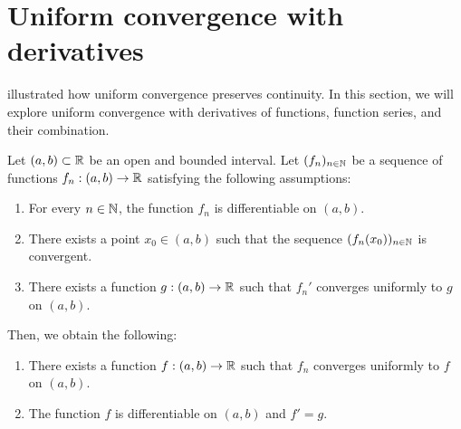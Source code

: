 \section{Uniform convergence with derivatives}
\label{sec:unif_diff}
 illustrated how uniform convergence preserves continuity. In this section, we will explore uniform convergence with derivatives of functions, function series, and their combination.
\begin{thm}
	\label{thm:unif_cvg_diff}
	Let $(a,b)\subset \mathbb{R}$ be an open and bounded interval. Let $(f_n)_{n\in\mathbb{N}}$ be a sequence of functions $f_n:(a,b)\to \mathbb{R}$ satisfying the following assumptions:
	\begin{enumerate}[label = \textbf{A\roman*)}]
		\item \label{unif_cvg_diff_1} For every $n\in\mathbb{N}$, the function $f_n$ is differentiable on $(a,b)$.
		\item \label{unif_cvg_diff_2} There exists a point $x_0 \in (a,b)$ such that the sequence $(f_n(x_0))_{n\in\mathbb{N}}$ is convergent.
		\item \label{unif_cvg_diff_3} There exists a function $g:(a,b)\to \mathbb{R}$ such that $f_n'$ converges uniformly to $g$ on $(a,b)$.
	\end{enumerate}
	Then, we obtain the following:
	\begin{enumerate}[label = \textbf{C\roman*)}]
		\item \label{unif_cvg_diff_C1} There exists a function $f:(a,b)\to \mathbb{R}$ such that $f_n$ converges uniformly to $f$ on $(a,b)$.
		\item \label{unif_cvg_diff_C2} The function $f$ is differentiable on $(a,b)$ and $f' = g$.
	\end{enumerate}
\end{thm}
